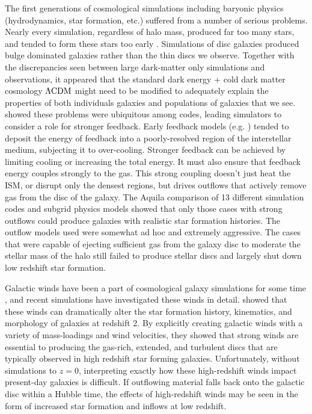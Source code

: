 The first generations of cosmological simulations including baryonic physics
(hydrodynamics, star formation, etc.) suffered from a number of serious
problems.  Nearly every simulation, regardless of halo mass, produced far too
many stars, and tended to form these stars too early \citep{Abadi2003,
Governato2009, Stinson2010, Brooks2011}.  Simulations of disc galaxies produced
bulge dominated galaxies rather than the thin discs we observe.  Together with
the discrepancies seen between large dark-matter only simulations and
observations, it appeared that the standard dark energy + cold dark matter
cosmology $\rm{\Lambda CDM}$ might need to be modified to adequately explain the
properties of both individuals galaxies and populations of galaxies that we see.
\cite{Scannapieco2012} showed these problems were ubiquitous among codes,
leading simulators to consider a role for stronger feedback.  Early feedback
models (e.g. \citealt{Katz1993}) tended to deposit the energy of feedback into a
poorly-resolved region of the interstellar medium, subjecting it to
over-cooling.  Stronger feedback can be achieved by limiting cooling or
increasing the total energy.  It must also ensure that feedback energy couples
strongly to the gas.  This strong coupling doesn't just heat the ISM, or disrupt
only the densest regions, but drives outflows that actively remove gas from the
disc of the galaxy.   The Aquila comparison of 13 different simulation codes and
subgrid physics models \citep{Scannapieco2012} showed that only those cases with
strong outflows could produce galaxies with realistic star formation histories.
The outflow models used were somewhat ad hoc and extremely aggressive.  The
cases that were capable of ejecting sufficient gas from the galaxy disc to
moderate the stellar mass of the halo still failed to produce stellar discs and
largely shut down low redshift star formation.

Galactic winds have been a part of cosmological galaxy simulations for 
some time \citep{Springel2003}, and recent simulations have investigated these
winds in detail.    \citet{AnglesAlcazar2014} showed that these winds can dramatically
alter the star formation history, kinematics, and morphology of galaxies at
redshift 2.  By explicitly creating galactic winds with a variety of
mass-loadings and wind velocities, they showed that strong winds are essential
to producing the gas-rich, extended, and turbulent discs that are typically
observed in high redshift star forming galaxies.  Unfortunately, without 
simulations to $z=0$, interpreting exactly how these high-redshift winds impact
present-day galaxies is difficult. If outflowing material falls back onto the
galactic disc within a Hubble time, the effects of high-redshift winds may be
seen in the form of increased star formation and inflows at low redshift.  

